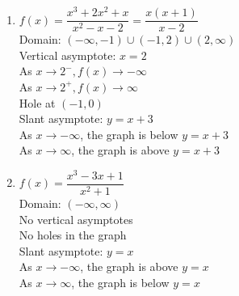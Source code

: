 \begin{multicols}{2}
\begin{enumerate}
\setcounter{enumi}{\value{HW}}


\item $f(x) = \dfrac{x^3+2x^2+x}{x^{2} -x-2} = \dfrac{x(x+1)}{x - 2}$\\
Domain: $(-\infty, -1) \cup (-1, 2) \cup (2, \infty)$\\
Vertical asymptote: $x = 2$\\
As $x \rightarrow 2^{-}, f(x) \rightarrow -\infty$\\
As $x \rightarrow 2^{+}, f(x) \rightarrow \infty$\\
Hole at $(-1,0)$ \\
Slant asymptote: $y=x+3$ \\
As $x \rightarrow -\infty$, the graph is below $y=x+3$\\
As $x \rightarrow \infty$, the graph is above $y=x+3$\\

\vfill

\columnbreak

\item $f(x) = \dfrac{x^3-3x+1}{x^2+1}$\\
Domain: $(-\infty, \infty)$\\
No vertical asymptotes \\
No holes in the graph \\
Slant asymptote: $y=x$ \\
As $x \rightarrow -\infty$, the graph is above $y=x$ \\
As $x \rightarrow \infty$, the graph is below $y=x$  \\


\setcounter{HW}{\value{enumi}}
\end{enumerate}
\end{multicols}

\newpage

